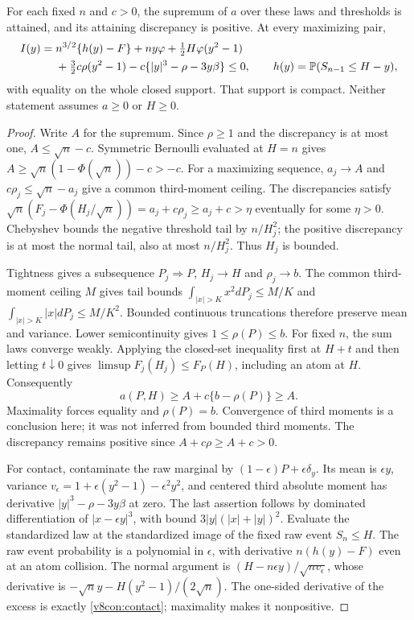 \begin{proposition}\label{v8con:attainment}
For each fixed $n$ and $c>0$, the supremum of $a$ over these laws and
thresholds is attained, and its attaining discrepancy is positive.
At every maximizing pair,
\begin{align}
 I(y)={}&n^{3/2}\{h(y)-F\}+ny\varphi
       +\tfrac12H\varphi(y^2-1)\notag\\
 &+\tfrac32c\rho(y^2-1)-c\{|y|^3-\rho-3y\beta\}\le0,
 \qquad h(y)=\mathbb P(S_{n-1}\le H-y),\label{v8con:contact}
\end{align}
with equality on the whole closed support. That support is compact.
Neither statement assumes $a\ge0$ or $H\ge0$.
\end{proposition}
\begin{proof}
Write $A$ for the supremum. Since $\rho\ge1$ and the discrepancy is
at most one, $A\le\sqrt n-c$. Symmetric Bernoulli evaluated at $H=n$
gives $A\ge\sqrt n(1-\Phi(\sqrt n))-c>-c$.
For a maximizing sequence, $a_j\to A$ and
$c\rho_j\le\sqrt n-a_j$ give a common third-moment ceiling.
The discrepancies satisfy $\sqrt n(F_j-\Phi(H_j/\sqrt n))
=a_j+c\rho_j\ge a_j+c>\eta$ eventually for some $\eta>0$.
Chebyshev bounds the negative threshold tail by $n/H_j^2$;
the positive discrepancy is at most the normal tail, also at most
$n/H_j^2$. Thus $H_j$ is bounded.

Tightness gives a subsequence $P_j\Rightarrow P$, $H_j\to H$ and
$\rho_j\to b$. The common third-moment ceiling $M$ gives tail
bounds $\int_{|x|>K}x^2dP_j\le M/K$ and
$\int_{|x|>K}|x|dP_j\le M/K^2$. Bounded continuous truncations
therefore preserve mean and variance. Lower semicontinuity gives
$1\le\rho(P)\le b$. For fixed $n$, the sum laws converge weakly.
Applying the closed-set inequality first at $H+t$ and then letting
$t\downarrow0$ gives
$\limsup F_j(H_j)\le F_P(H)$, including an atom at $H$.
Consequently
\[
 a(P,H)\ge A+c\{b-\rho(P)\}\ge A.
\]
Maximality forces equality and $\rho(P)=b$. Convergence of third
moments is a conclusion here; it was not inferred from bounded third
moments. The discrepancy remains positive since $A+c\rho\ge A+c>0$.

For contact, contaminate the raw marginal by
$(1-\epsilon)P+\epsilon\delta_y$. Its mean is $\epsilon y$,
variance $v_\epsilon=1+\epsilon(y^2-1)-\epsilon^2y^2$, and centered
third absolute moment has derivative $|y|^3-\rho-3y\beta$ at zero.
The last assertion follows by dominated differentiation of
$|x-\epsilon y|^3$, with bound $3|y|(|x|+|y|)^2$.
Evaluate the standardized law at the standardized image of the fixed
raw event $S_n\le H$. The raw event probability is a polynomial in
$\epsilon$, with derivative $n(h(y)-F)$ even at an atom collision.
The normal argument is
$(H-n\epsilon y)/\sqrt{nv_\epsilon}$, whose derivative is
$-\sqrt n y-H(y^2-1)/(2\sqrt n)$.
The one-sided derivative of the excess is exactly \eqref{v8con:contact};
maximality makes it nonpositive.


\end{proof}
